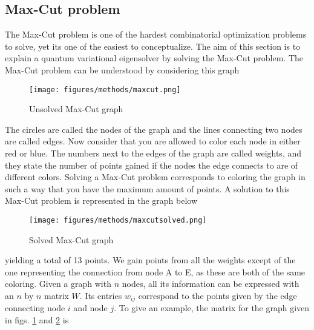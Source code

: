 \subsection{Max-Cut problem}
\label{subsec:VQEMaxCut}
The Max-Cut problem is one of the hardest combinatorial optimization problems to solve, yet its one of the easiest to conceptualize. The aim of this section is to explain a quantum variational eigensolver by solving the Max-Cut problem. The Max-Cut problem can be understood by considering this graph
\begin{figure}[H]
    \centering
    \texttt{[image: figures/methods/maxcut.png]}
    \caption{Unsolved Max-Cut graph}
    \label{fig:maxcutunsolved}
\end{figure}
The circles are called the nodes of the graph and the lines connecting two nodes are called edges. Now consider that you are allowed to color each node in either red or blue. The numbers next to the edges of the graph are called weights, and they state the number of points gained if the nodes the edge connects to are of different colors. Solving a Max-Cut problem corresponds to coloring the graph in such a way that you have the maximum amount of points.
A solution to this Max-Cut problem is represented in the graph below
\begin{figure}[H]
    \centering
    \texttt{[image: figures/methods/maxcutsolved.png]}
    \caption{Solved Max-Cut graph}
    \label{fig:maxcutsolved}
\end{figure}
yielding a total of 13 points. We gain points from all the weights except of the one representing the connection from node A to E, as these are both of the same coloring. Given a graph with $n$ nodes, all its information can be expressed with an $n$ by $n$ matrix $W$. Its entries $w_{ij}$ correspond to the points given by the edge connecting node $i$ and node $j$.
To give an example, the matrix for the graph given in figs. \ref{fig:maxcutunsolved} and \ref{fig:maxcutsolved} is

